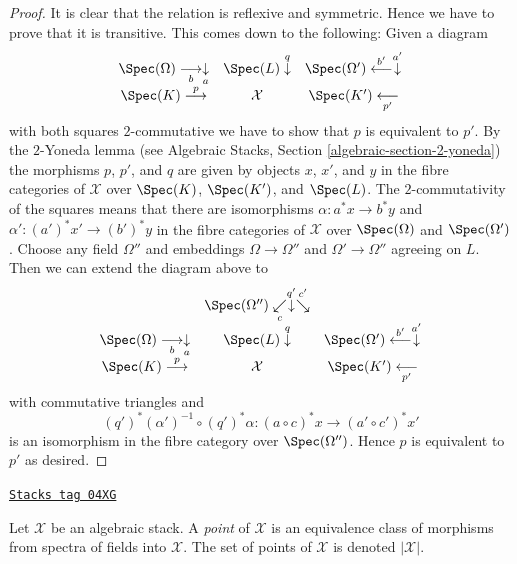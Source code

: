 \begin{proof}
It is clear that the relation is reflexive and symmetric.
Hence we have to prove that it is transitive. This comes down
to the following: Given a diagram
$$
\begin{array}{ccc}\Spec(\Omega) \underset{b}{\longrightarrow}\underset{a}{\downarrow} & \Spec(L) \overset{q}{\downarrow} & \Spec(\Omega') \overset{b'}{\longleftarrow}\overset{a'}{\downarrow} \\ \Spec(K) \overset{p}{\longrightarrow} & \mathcal{X} & \Spec(K') \underset{p'}{\longleftarrow}\end{array}
$$
with both squares $2$-commutative we have to show that $p$ is equivalent to
$p'$. By the $2$-Yoneda lemma (see
Algebraic Stacks, Section \ref{algebraic-section-2-yoneda})
the morphisms $p$, $p'$, and $q$ are given by objects
$x$, $x'$, and $y$ in the fibre categories of $\mathcal{X}$ over
$\Spec(K)$, $\Spec(K')$, and $\Spec(L)$. The
$2$-commutativity of the squares means that there are isomorphisms
$\alpha : a^*x \to b^*y$ and $\alpha' : (a')^*x' \to (b')^*y$
in the fibre categories
of $\mathcal{X}$ over $\Spec(\Omega)$ and $\Spec(\Omega')$.
Choose any field $\Omega''$ and embeddings
$\Omega \to \Omega''$ and $\Omega' \to \Omega''$ agreeing on $L$.
Then we can extend the diagram above to
$$
\begin{array}{ccc} & \Spec(\Omega'') \underset{c}{\swarrow}\overset{q'}{\downarrow}\overset{c'}{\searrow} &  \\ \Spec(\Omega) \underset{b}{\longrightarrow}\underset{a}{\downarrow} & \Spec(L) \overset{q}{\downarrow} & \Spec(\Omega') \overset{b'}{\longleftarrow}\overset{a'}{\downarrow} \\ \Spec(K) \overset{p}{\longrightarrow} & \mathcal{X} & \Spec(K') \underset{p'}{\longleftarrow}\end{array}
$$
with commutative triangles and
$$
(q')^*(\alpha')^{-1} \circ (q')^*\alpha :
(a \circ c)^*x
\longrightarrow
(a' \circ c')^*x'
$$
is an isomorphism in the fibre category over $\Spec(\Omega'')$.
Hence $p$ is equivalent to $p'$ as desired.
\end{proof}

\begin{definition}[Points]
\label{stacks-properties-definition-points}
\href{https://stacks.math.columbia.edu/tag/04XG}{\texttt{Stacks tag 04XG}}

Let $\mathcal{X}$ be an algebraic stack.
A {\it point} of $\mathcal{X}$ is an equivalence class of morphisms
from spectra of fields into $\mathcal{X}$.
The set of points of $\mathcal{X}$ is denoted $|\mathcal{X}|$.
\end{definition}

